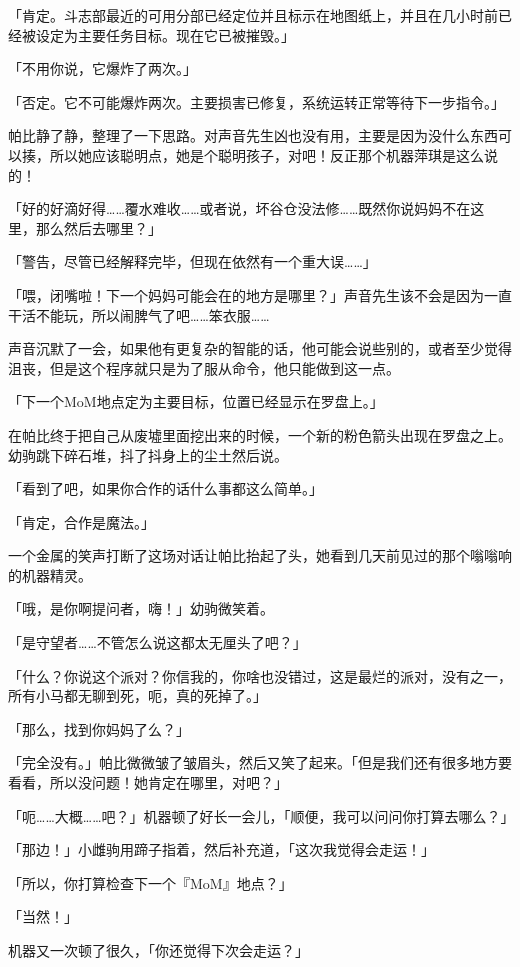 「{\mt 肯定。斗志部最近的可用分部已经定位并且标示在地图纸上，并且在几小时前已经被设定为主要任务目标。现在它已被摧毁。}」

「不用你说，它爆炸了两次。」

「{\mt 否定。它不可能爆炸两次。主要损害已修复，系统运转正常等待下一步指令。}」

帕比静了静，整理了一下思路。对声音先生凶也没有用，主要是因为没什么东西可以揍，所以她应该聪明点，她是个聪明孩子，对吧！反正那个机器萍琪是这么说的！

「好的好滴好得……覆水难收……或者说，坏谷仓没法修……既然你说妈妈不在这里，那么然后去哪里？」

「{\mt 警告，尽管已经解释完毕，但现在依然有一个重大误……}」

「喂，闭嘴啦！下一个妈妈可能会在的地方是哪里？」声音先生该不会是因为一直干活不能玩，所以闹脾气了吧……笨衣服……

声音沉默了一会，如果他有更复杂的智能的话，他可能会说些别的，或者至少觉得沮丧，但是这个程序就只是为了服从命令，他只能做到这一点。

「{\mt 下一个MoM地点定为主要目标，位置已经显示在罗盘上。}」

在帕比终于把自己从废墟里面挖出来的时候，一个新的粉色箭头出现在罗盘之上。幼驹跳下碎石堆，抖了抖身上的尘土然后说。

「看到了吧，如果你合作的话什么事都这么简单。」

「{\mt 肯定，合作是魔法。}」

一个金属的笑声打断了这场对话让帕比抬起了头，她看到几天前见过的那个嗡嗡响的机器精灵。

「哦，是你啊提问者，嗨！」幼驹微笑着。

「是守望者……不管怎么说这都太无厘头了吧？」

「什么？你说这个派对？你信我的，你啥也没错过，这是最烂的派对，没有之一，所有小马都无聊到死，呃，真的死掉了。」

「那么，找到你妈妈了么？」

「完全没有。」帕比微微皱了皱眉头，然后又笑了起来。「但是我们还有很多地方要看看，所以没问题！她肯定在哪里，对吧？」

「呃……大概……吧？」机器顿了好长一会儿，「顺便，我可以问问你打算去哪么？」

「那边！」小雌驹用蹄子指着，然后补充道，「这次我觉得会走运！」

「所以，你打算检查下一个『MoM』地点？」

「当然！」

机器又一次顿了很久，「你还觉得下次会走运？」

